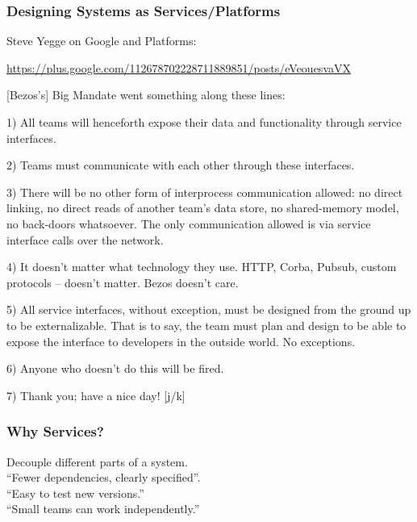 \documentclass[aspectratio=43]{beamer}
\newenvironment{changemargin}[1]{%
  \begin{list}{}{%
    \setlength{\topsep}{0pt}%
    \setlength{\leftmargin}{#1}%
    \setlength{\rightmargin}{1em}
    \setlength{\listparindent}{\parindent}%
    \setlength{\itemindent}{\parindent}%
    \setlength{\parsep}{\parskip}%
  }%
  \item[]}{\end{list}}
\begin{document}
\begin{frame}
  \frametitle{Designing Systems as Services/Platforms}

\qquad \qquad Steve Yegge on Google and Platforms:
\begin{center}
\scriptsize \url{https://plus.google.com/112678702228711889851/posts/eVeouesvaVX}
\end{center}

  \begin{changemargin}{1cm}
\small
[Bezos's] Big Mandate went something along these lines:

1) All teams will henceforth expose their data and functionality through service interfaces.

2) Teams must communicate with each other through these interfaces.

3) There will be no other form of interprocess communication allowed: no direct linking, no direct reads of another team's data store, no shared-memory model, no back-doors whatsoever. The only communication allowed is via service interface calls over the network.

4) It doesn't matter what technology they use. HTTP, Corba, Pubsub, custom protocols -- doesn't matter. Bezos doesn't care.

5) All service interfaces, without exception, must be designed from the ground up to be externalizable. That is to say, the team must plan and design to be able to expose the interface to developers in the outside world. No exceptions.

6) Anyone who doesn't do this will be fired.

7) Thank you; have a nice day! [j/k]
  \end{changemargin}
\end{frame}

\begin{frame}
  \frametitle{Why Services?}
  \begin{changemargin}{2cm}
    Decouple different parts of a system.\\[1em]

    ``Fewer dependencies, clearly specified''.\\[1em]

    ``Easy to test new versions.''\\[1em]

    ``Small teams can work independently.''
  \end{changemargin}
\end{frame}
\end{document}
